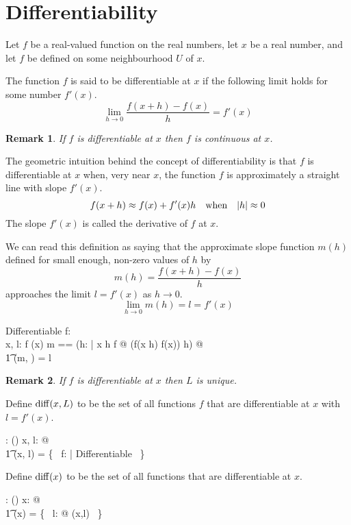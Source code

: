 \documentclass[11pt, oneside]{article}
\newtheorem*{remark}{Remark}
\begin{document}
\section{Differentiability}

Let $f$ be a real-valued function on the real numbers, let $x$ be a real number,
and let $f$ be defined on some neighbourhood $U$ of $x$.

The function $f$ is said to be differentiable at $x$ if the following limit holds for some number $f'(x)$.
$$
\lim_{h \to 0} \frac{f(x+h) - f(x)}{h} = f'(x)
$$

\begin{remark}
If $f$ is differentiable at $x$ then $f$ is continuous at $x$.
\end{remark}

The geometric intuition behind the concept of differentiability is that $f$ is differentiable at $x$
when, very near $x$, the function $f$ is approximately a straight line with slope $f'(x)$.
$$
f(x + h) \approx f(x) + f'(x) h \quad \text{when} \quad \abs{h} \approx 0
$$
The slope $f'(x)$ is called the derivative of $f$ at $x$.

We can read this definition as saying that the approximate slope function $m(h)$ defined for 
small enough, non-zero values of $h$ by
$$
	m(h) = \frac{f(x + h) - f(x)}{h}
$$
approaches the limit $l = f'(x)$ as $h \to 0$.
$$
	\lim_{h\to 0}{m(h)} = l = f'(x)
$$

\begin{schema}{Differentiable}
	f: \R \pfun \R \\
	x, l: \R
\where
	f \in \CzeroR(x)
\also
	\LET m == (\lambda h: \Rnz | x \addR h \in \dom f @ (f(x \addR h) \subR f(x)) \divR h) @ \\
	\t1	\limFR(m, \zeroR) = l
\end{schema}
\begin{remark}
If $f$ is differentiable at $x$ then $L$ is unique.
\end{remark}

Define $\operatorname{diff}(x,L)$ to be the set of all functions $f$ that are differentiable at $x$ with $l = f'(x)$.
\begin{axdef}
	\diffRR: \R \cross \R \fun \power(\R \pfun \R)
\where
	\forall x, l: \R @ \\
	\t1	\diffRR(x, l) = \{~ f: \R \pfun \R | Differentiable ~\}
\end{axdef}

Define $\operatorname{diff}(x)$ to be the set of all functions that are differentiable at $x$.
\begin{axdef}
	\diffR: \R \fun \power(\R \pfun \R)
\where
	\forall x: \R @ \\
	\t1	\diffR(x) = \bigcup \{~ l: \R @ \diffRR(x,l) ~\}
\end{axdef}
\end{document}
